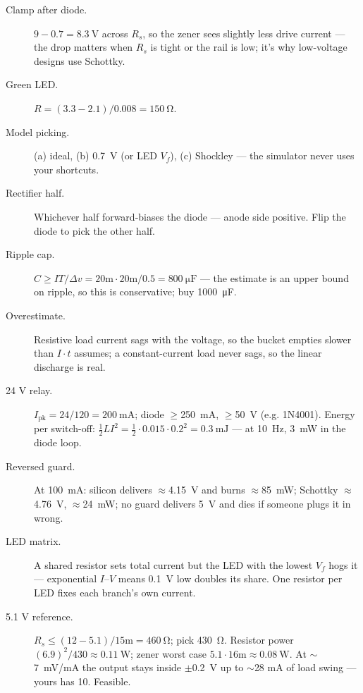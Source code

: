 \begin{description}
\item[Clamp after diode.] $9-0.7=\qty{8.3}{\volt}$ across $R_s$, so the
zener sees slightly less drive current --- the drop matters when $R_s$
is tight or the rail is low; it's why low-voltage designs use Schottky.
\item[Green LED.] $R=(3.3-2.1)/0.008=\qty{150}{\ohm}$.
\item[Model picking.] (a) ideal, (b) \qty{0.7}{\volt} (or LED $V_f$),
(c) Shockley --- the simulator never uses your shortcuts.
\item[Rectifier half.] Whichever half forward-biases the diode ---
anode side positive. Flip the diode to pick the other half.
\item[Ripple cap.] $C\ge IT/\Delta v=20\text{m}\cdot20\text{m}/0.5
=\qty{800}{\micro\farad}$ --- the estimate is an upper bound on ripple,
so this is conservative; buy \qty{1000}{\micro\farad}.
\item[Overestimate.] Resistive load current sags with the voltage, so
the bucket empties slower than $I\cdot t$ assumes; a constant-current
load never sags, so the linear discharge is real.
\item[24 V relay.] $I_{\mathrm{pk}}=24/120=\qty{200}{\milli\ampere}$;
diode $\ge$\qty{250}{\milli\ampere}, $\ge$\qty{50}{\volt} (e.g.
1N4001). Energy per switch-off:
$\frac12 LI^2=\frac12\cdot0.015\cdot0.2^2=\qty{0.3}{\milli\joule}$ ---
at \qty{10}{\hertz}, \qty{3}{\milli\watt} in the diode loop.
\item[Reversed guard.] At \qty{100}{\milli\ampere}: silicon delivers
$\approx$\qty{4.15}{\volt} and burns $\approx$\qty{85}{\milli\watt};
Schottky $\approx$\qty{4.76}{\volt}, $\approx$\qty{24}{\milli\watt};
no guard delivers \qty{5}{\volt} and dies if someone plugs it in wrong.
\item[LED matrix.] A shared resistor sets total current but the LED
with the lowest $V_f$ hogs it --- exponential $I$--$V$ means
\qty{0.1}{\volt} low doubles its share. One resistor per LED fixes
each branch's own current.
\item[5.1 V reference.] $R_s\le(12-5.1)/15\text{m}=\qty{460}{\ohm}$;
pick \qty{430}{\ohm}. Resistor power $(6.9)^2/430\approx\qty{0.11}{\watt}$;
zener worst case $5.1\cdot16\text{m}\approx\qty{0.08}{\watt}$.
At $\sim$\qty{7}{\milli\volt}/mA the output stays inside
$\pm$\qty{0.2}{\volt} up to $\sim$28 mA of load swing --- yours has 10.
Feasible.
\end{description}

